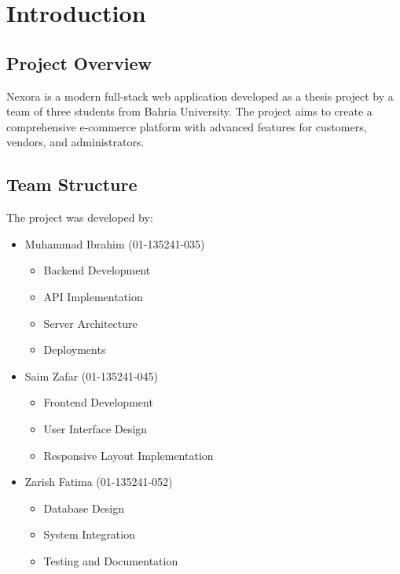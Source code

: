 \chapter{Introduction}\label{chap:introduction}

\section{Project Overview}
Nexora is a modern full-stack web application developed as a thesis project by a team of three students from Bahria University. The project aims to create a comprehensive e-commerce platform with advanced features for customers, vendors, and administrators.

\section{Team Structure}
The project was developed by:
\begin{itemize}
    \item Muhammad Ibrahim (01-135241-035)
    \begin{itemize}
        \item Backend Development
        \item API Implementation
        \item Server Architecture
        \item Deployments
    \end{itemize}
    \item Saim Zafar (01-135241-045)
    \begin{itemize}
        \item Frontend Development
        \item User Interface Design
        \item Responsive Layout Implementation
    \end{itemize}
    \item Zarish Fatima (01-135241-052)
    \begin{itemize}
        \item Database Design
        \item System Integration
        \item Testing and Documentation
    \end{itemize}
\end{itemize}

